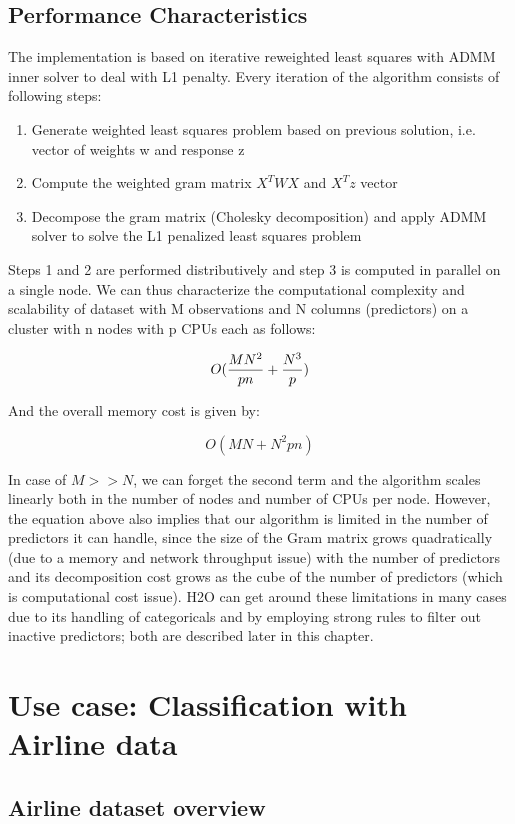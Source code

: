 \documentclass[11pt]{article}
\begin{document}
\subsection{Performance Characteristics}
The implementation is based on iterative reweighted least squares with ADMM \cite{admm} inner solver to deal with L1 penalty. Every iteration of the algorithm consists of following steps:
\begin{enumerate} 
\item Generate weighted least squares problem based on previous solution, i.e. vector of weights w and response z 
\item Compute the weighted gram matrix $X^TWX$ and $X^Tz$ vector
\item Decompose the gram matrix (Cholesky decomposition) and apply ADMM solver to solve the L1 penalized least squares problem
\end{enumerate}

Steps 1 and 2 are performed distributively and step 3 is computed in parallel on a single node. We can thus characterize the computational complexity and scalability of dataset with M observations and N columns (predictors) on a cluster with n nodes with p CPUs each as follows:

\[ O({MN^2 \over pn} + {N^3 \over p})\]

And the overall memory cost is given by:

\[ O(MN + N^2pn)\]

In case of $M >> N$, we can forget the second term and the algorithm scales linearly both in the number of nodes and number of CPUs per node. However, the equation above also implies that our algorithm is limited in the number of predictors it can handle, since the size of the Gram matrix grows quadratically (due to a memory and network throughput issue) with the number of predictors and its decomposition cost grows as the cube of the number of predictors (which is computational cost issue). H2O can get around these limitations in many cases due to its handling of categoricals and by employing strong rules to filter out inactive predictors; both are described later in this chapter.  


\section{Use case: Classification with Airline data}


\subsection{Airline dataset overview} 
\end{document}
